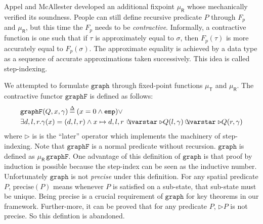 Appel and McAllester developed an additional fixpoint
$\mu_{\mathsf{R}}$ \cite{appel:fixpoint} whose \cite{appel:vmm}
mechanically verified its soundness. People can still define recursive
predicate $P$ through $F_p$ and $\mu_{\mathsf{R}}$, but this time the
$F_p$ needs to be \emph{contractive}. Informally, a contractive
function is one such that if $\tau$ is approximately equal to
$\sigma$, then $F_p(\tau)$ is more accurately equal to
$F_p(\sigma)$. The approximate equality is achieved by a data type as
a sequence of accurate approximations taken successively. This idea is
called step-indexing.

We attempted to formulate $\mathtt{graph}$ through fixed-point
functions $\mu_{\mathsf{T}}$ and $\mu_{\mathsf{R}}$. The contractive
functor $\mathtt{graphF}$ is defined as follows:
\[\label{eqn:graphFcotr}
  \begin{split}
  & \mathtt{graphF}(Q, x, \gamma)\defeq (x = 0 \wedge \mathtt{emp})
    \vee \\ & \exists d,l,r . \gamma(x)=(d,l,r) \wedge x \mapsto
    d,l,r\, \ocon \triangleright Q(l, \gamma) \ocon \triangleright
    Q(r, \gamma)
  \end{split}
\]
where $\triangleright$ is is the ``later'' operator which implements
the machinery of step-indexing. Note that $\mathtt{graphF}$ is a
normal predicate without recursion. $\mathtt{graph}$ is defined as
$\mu_{\mathsf{R}}\,\mathtt{graphF}$. One advantage of this definition
of $\mathtt{graph}$ is that proof by induction is possible because the
step-index can be seen as the inductive number. Unfortunately
$\mathtt{graph}$ is not \emph{precise} under this definition. For any
spatial predicate $P$, $\text{precise}(P)$ means whenever $P$ is
satisfied on a sub-state, that sub-state must be unique. Being precise
is a crucial requirement of $\mathtt{graph}$ for key theorems in our
framework. Further-more, it can be proved that for any predicate $P$,
$\triangleright P$ is not precise. So this defintion is abandoned.

